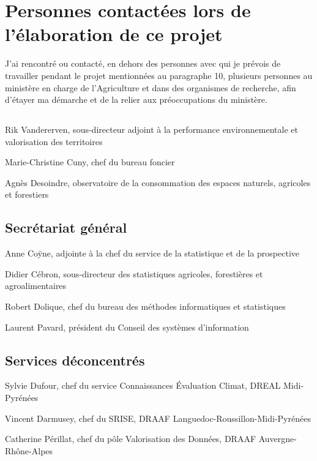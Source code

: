 \section
{Personnes contactées lors de l’élaboration de ce projet}

J’ai rencontré ou contacté, en dehors des personnes avec qui je prévois de travailler
pendant le projet mentionnées au paragraphe 10, plusieurs personnes au ministère
en charge de l’Agriculture et dans des organismes de recherche,
afin d’étayer ma démarche et de la relier aux préoccupations du ministère.

\subsection{}

\startitemize[5,packed]
\item Rik Vandererven, sous-directeur adjoint à la performance environnementale
	et valorisation des territoires
\item Marie-Christine Cuny, chef du bureau foncier
\item Agnès Desoindre, observatoire de la consommation des espaces naturels,
	agricoles et forestiers
\stopitemize

\subsection{Secrétariat général}

\startitemize[5,packed]
\item Anne Coÿne, adjointe à la chef du service de la statistique et de la prospective
\item Didier Cébron, sous-directeur des statistiques agricoles, forestières et agroalimentaires
\item Robert Dolique, chef du bureau des méthodes informatiques et statistiques
\item Laurent Pavard, président du Conseil des systèmes d’information
\stopitemize

\subsection{Services déconcentrés}

\startitemize[5,packed]
\item Sylvie Dufour, chef du service Connaissances Évaluation Climat, DREAL Midi-Pyrénées
\item Vincent Darmusey, chef du SRISE, DRAAF Languedoc-Roussillon-Midi-Pyrénées
\item Catherine Périllat, chef du pôle Valorisation des Données,
	DRAAF Auvergne-Rhône-Alpes
\stopitemize

